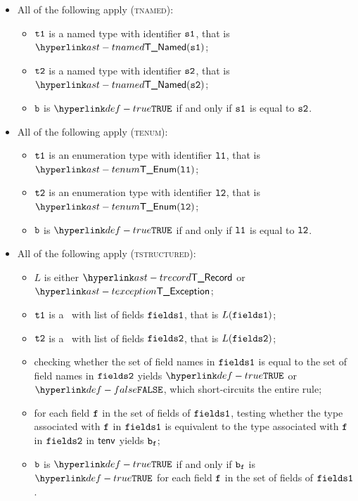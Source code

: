 \begin{itemize}
  \item All of the following apply (\textsc{tnamed}):
  \begin{itemize}
    \item $\texttt{t1}$ is a named type with identifier $\texttt{s1}$, that is $\TNamed(\vsone)$;
    \item $\texttt{t2}$ is a named type with identifier $\texttt{s2}$, that is $\TNamed(\vstwo)$;
    \item $\texttt{b}$ is $\True$ if and only if $\texttt{s1}$ is equal to $\texttt{s2}$.
  \end{itemize}

  \item All of the following apply (\textsc{tenum}):
  \begin{itemize}
    \item $\texttt{t1}$ is an enumeration type with identifier $\texttt{l1}$, that is $\TEnum(\vlone)$;
    \item $\texttt{t2}$ is an enumeration type with identifier $\texttt{l2}$, that is $\TEnum(\vltwo)$;
    \item $\texttt{b}$ is $\True$ if and only if $\texttt{l1}$ is equal to $\texttt{l2}$.
  \end{itemize}

  \item All of the following apply (\textsc{tstructured}):
  \begin{itemize}
    \item $L$ is either $\TRecord$ or $\TException$;
    \item $\texttt{t1}$ is a \structuredtype\ with list of fields $\texttt{fields1}$, that is $L(\texttt{fields1})$;
    \item $\texttt{t2}$ is a \structuredtype\ with list of fields $\texttt{fields2}$, that is $L(\texttt{fields2})$;
    \item checking whether the set of field names in $\texttt{fields1}$ is equal to the set of field names in $\texttt{fields2}$
          yields $\True$ or $\False$, which short-circuits the entire rule;
    \item for each field $\texttt{f}$ in the set of fields of $\texttt{fields1}$, testing whether the type associated with
          $\texttt{f}$ in $\texttt{fields1}$ is equivalent to the type associated with
          $\texttt{f}$ in $\texttt{fields2}$ in $\textsf{tenv}$ yields $\texttt{b}_{\texttt{f}}$\ProseOrTypeError;
    \item $\texttt{b}$ is $\True$ if and only if $\texttt{b}_{\texttt{f}}$ is $\True$ for each field $\texttt{f}$ in the set of fields of $\texttt{fields1}$.
  \end{itemize}


\end{itemize}
